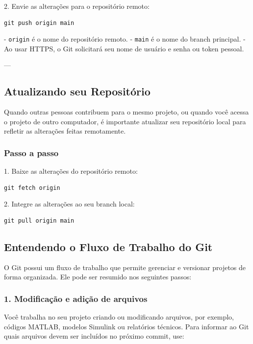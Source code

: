 2. Envie as alterações para o repositório remoto:

\begin{lstlisting}[style=shellstyle]
git push origin main
\end{lstlisting}

\noindent
- \texttt{origin} é o nome do repositório remoto.  
- \texttt{main} é o nome do branch principal.  
- Ao usar HTTPS, o Git solicitará seu nome de usuário e senha ou token pessoal.

---

\subsection{Atualizando seu Repositório}

Quando outras pessoas contribuem para o mesmo projeto, ou quando você acessa o projeto de outro computador, é importante atualizar seu repositório local para refletir as alterações feitas remotamente.

\subsubsection*{Passo a passo}

1. Baixe as alterações do repositório remoto:

\begin{lstlisting}[style=shellstyle]
git fetch origin
\end{lstlisting}

2. Integre as alterações ao seu branch local:

\begin{lstlisting}[style=shellstyle]
git pull origin main
\end{lstlisting}


\subsection{Entendendo o Fluxo de Trabalho do Git}

O Git possui um fluxo de trabalho que permite gerenciar e versionar projetos de forma organizada. Ele pode ser resumido nos seguintes passos:

\subsubsection*{1. Modificação e adição de arquivos}

Você trabalha no seu projeto criando ou modificando arquivos, por exemplo, códigos MATLAB, modelos Simulink ou relatórios técnicos. Para informar ao Git quais arquivos devem ser incluídos no próximo commit, use:


